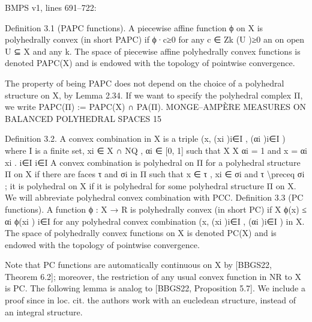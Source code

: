 \documentclass[
  11pt,
]{article}
\newenvironment{Shaded}{}{}
\newcommand{\NormalTok}[1]{#1}
\begin{document}
BMPS v1, lines 691--722:

\begin{Shaded}
\begin{Highlighting}[]
\NormalTok{Definition 3.1 (PAPC functions). A piecewise affine function ϕ on X is polyhedrally convex}
\NormalTok{(in short PAPC) if}
\NormalTok{                                      ϕ·c≥0}
\NormalTok{for any c ∈ Zk (U )≥0 an on open U ⊆ X and any k. The space of piecewise affine polyhedrally}
\NormalTok{convex functions is denoted PAPC(X) and is endowed with the topology of pointwise convergence.}

\NormalTok{  The property of being PAPC does not depend on the choice of a polyhedral structure on X, by}
\NormalTok{Lemma 2.34. If we want to specify the polyhedral complex Π, we write}
\NormalTok{                                          PAPC(Π) := PAPC(X) ∩ PA(Π).}
\NormalTok{                   MONGE–AMPÈRE MEASURES ON BALANCED POLYHEDRAL SPACES                                      15}


\NormalTok{Definition 3.2. A convex combination in X is a triple}
\NormalTok{                                               (x, (xi )i∈I , (αi )i∈I )}
\NormalTok{where I is a finite set, xi ∈ X ∩ NQ , αi ∈ [0, 1] such that}
\NormalTok{                                   X                       X}
\NormalTok{                                       αi = 1 and x =        αi xi .}
\NormalTok{                                        i∈I                          i∈I}
\NormalTok{A convex combination is polyhedral on Π for a polyhedral structure Π on X if there are faces τ}
\NormalTok{and σi in Π such that x ∈ τ , xi ∈ σi and τ \textbackslash{}preceq σi ; it is polyhedral on X if it is polyhedral for some}
\NormalTok{polyhedral structure Π on X. We will abbreviate polyhedral convex combination with PCC.}
\NormalTok{Definition 3.3 (PC functions). A function ϕ : X → R is polyhedrally convex (in short PC) if}
\NormalTok{                                          X}
\NormalTok{                                   ϕ(x) ≤      αi ϕ(xi )}
\NormalTok{                                                           i∈I}
\NormalTok{for any polyhedral convex combination (x, (xi )i∈I , (αi )i∈I ) in X. The space of polyhedrally convex}
\NormalTok{functions on X is denoted PC(X) and is endowed with the topology of pointwise convergence.}

\NormalTok{   Note that PC functions are automatically continuous on X by [BBGS22, Theorem 6.2]; moreover,}
\NormalTok{the restriction of any usual convex function in NR to X is PC. The following lemma is analog to}
\NormalTok{[BBGS22, Proposition 5.7]. We include a proof since in loc. cit. the authors work with an eucledean}
\NormalTok{structure, instead of an integral structure.}
\end{Highlighting}
\end{Shaded}
\end{document}
